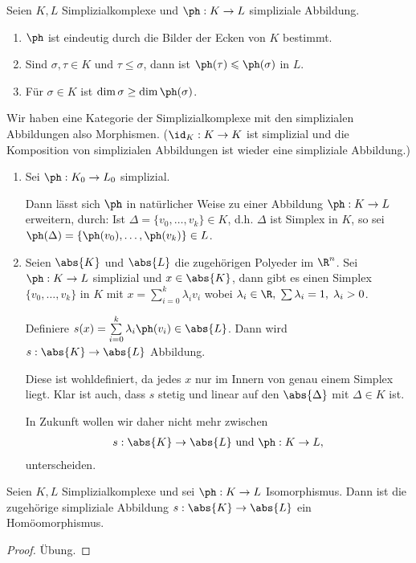 \begin{bemn}
Seien $K,L$ Simplizialkomplexe und $\ph: K\to L$ simpliziale Abbildung.
\begin{enumerate}[label=\alph{*})]
  \item $\ph$ ist eindeutig durch die Bilder der Ecken von $K$ bestimmt.
  \item Sind $\sigma,\tau\in K$ und $\tau\leqslant\sigma$, dann ist
  $\ph(\tau)\leqslant\ph(\sigma)$ in $L$.
  \item Für $\sigma\in K$ ist $\dim \sigma \ge \dim\ph(\sigma)$.
\end{enumerate}
Wir haben eine Kategorie der Simplizialkomplexe mit den simplizialen
Abbildungen also Morphismen. ($\id_K: K\to K$ ist simplizial und die
Komposition von simplizialen Abbildungen ist wieder eine simpliziale
Abbildung.)\maphere
\end{bemn}
\begin{bemn}[Bemerkungen.]
\begin{enumerate}[label=\arabic{*}.)]
  \item Sei $\ph: K_0\to L_0$ simplizial.

Dann lässt sich $\ph$ in natürlicher Weise zu einer Abbildung $\ph: K\to L$
erweitern, durch:
Ist $\Delta = \{v_0,\ldots,v_k\}\in K$, d.h. $\Delta$ ist Simplex in $K$, so
sei $\ph(\Delta) = \{\ph(v_0),\ldots,\ph(v_k)\}\in L$.
\item Seien $\abs{K}$ und $\abs{L}$ die zugehörigen Polyeder im $\R^n$. Sei
$\ph: K\to L$ simplizial und $x\in\abs{K}$, dann gibt es einen Simplex
$\{v_0,\ldots,v_k\}$ in $K$ mit $x=\sum\limits_{i=0}^k \lambda_i v_i$ wobei
$\lambda_i\in\R,\;\sum \lambda_i = 1,\;\lambda_i > 0$.

Definiere $s(x) = \sum\limits_{i=0}^k \lambda_i \ph(v_i)\in\abs{L}$. Dann wird
$s: \abs{K}\to\abs{L}$ Abbildung.

Diese ist wohldefiniert, da jedes $x$ nur im Innern von genau einem Simplex
liegt. Klar ist auch, dass $s$ stetig und linear auf den $\abs{\Delta}$ mit
$\Delta \in K$ ist.

In Zukunft wollen wir daher nicht mehr zwischen
\begin{align*}
s: \abs{K}\to\abs{L} \text{ und } \ph: K\to L,
\end{align*}
unterscheiden.\maphere
\end{enumerate}
\end{bemn}
\begin{lem}
\label{prop:4.1.8}
Seien $K,L$ Simplizialkomplexe und sei $\ph: K\to L$ Isomorphismus. Dann ist
die zugehörige simpliziale Abbildung $s: \abs{K}\to\abs{L}$ ein
Homöomorphismus.\fishhere
\end{lem}
\begin{proof}
Übung.\qedhere
\end{proof}

